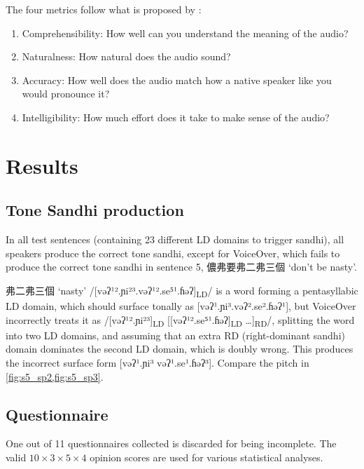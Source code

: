 \documentclass[11pt]{article}
\begin{document}
The four metrics follow what is proposed by \citet{cardosoEvaluatingTexttospeechSynthesizers2015}:
\begin{enumerate}
    \item Comprehensibility: How well can you understand the meaning of the audio?
    \item Naturalness: How natural does the audio sound?
    \item Accuracy: How well does the audio match how a native speaker like you would pronounce it?
    \item Intelligibility: How much effort does it take to make sense of the audio?
\end{enumerate}

\section{Results}
\subsection{Tone Sandhi production}
In all test sentences (containing 23 different LD domains to trigger sandhi), all speakers produce the correct tone sandhi, except for VoiceOver, which fails to produce the correct tone sandhi in sentence 5, 儂弗要弗二弗三個 `don't be nasty'.

弗二弗三個 `nasty' /[vəʔ¹².ɲi²³.vəʔ¹².se⁵¹.ɦəʔ]\textsubscript{LD}/ is a word forming a pentasyllabic LD domain, which should surface tonally as [vəʔ¹.ɲi³.vəʔ².se².ɦəʔ¹], but VoiceOver incorrectly treats it as /[vəʔ¹².ɲi²³]\textsubscript{LD} [[vəʔ¹².se⁵¹.ɦəʔ]\textsubscript{LD} \ldots]\textsubscript{RD}/, splitting the word into two LD domains, and assuming that an extra RD (right-dominant sandhi) domain dominates the second LD domain, which is doubly wrong. This produces the incorrect surface form [vəʔ¹.ɲi³ vəʔ¹.se¹.ɦəʔ³].
Compare the pitch in \cref{fig:s5_sp2,fig:s5_sp3}.

\subsection{Questionnaire}
One out of 11 questionnaires collected is discarded for being incomplete. The valid $10 \times 3 \times 5 \times 4$ opinion scores are used for various statistical analyses.
\end{document}
